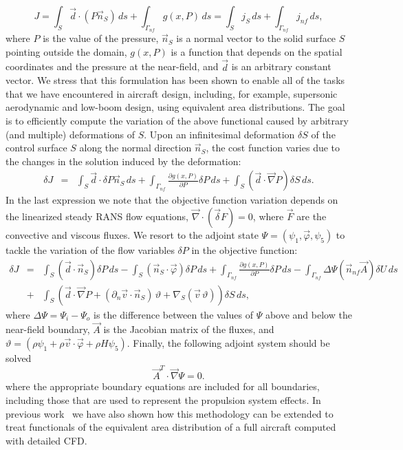 \documentclass[]{aiaa-tc}
\begin{document}
\begin{equation}
J =\int_S{\vec d \cdot (P \vec n_S)\,ds}+\int_{\Gamma_{nf}}{g(x,P)\,ds} = \int_S{j_S\,ds}+\int_{\Gamma_{nf}}{j_{nf}\,ds},
\end{equation}
where $P$ is the value of the pressure, $\vec n_S$ is a normal vector to the solid surface $S$ pointing outside the domain, $g(x, P)$ is a function that depends on the spatial coordinates and the pressure at the near-field, and $\vec d$ is an arbitrary constant vector. We stress that this formulation has been shown to enable all of the tasks that we have encountered in aircraft design, including, for example, supersonic aerodynamic and low-boom design, using equivalent area distributions. The goal is to efficiently compute the variation of the above functional caused by arbitrary (and multiple) deformations of $S$.
%
Upon an infinitesimal deformation $\delta S$ of the control surface $S$ along the normal direction $\vec n_S$, the cost function varies due to the changes in the solution induced by the deformation:
\begin{eqnarray} \label{objvar}
\delta J &=&  \int_S{\vec d \cdot \delta P \vec n_S \,ds} + \int_{\Gamma_{nf}}{\frac{\partial g(x,P)}{\partial P}\delta P\,ds}  + \int_{S}{(\vec d\cdot\vec\nabla P )\delta S \,ds}.
\end{eqnarray}
%
In the last expression we note that the objective function variation depends on the linearized steady RANS flow equations, $\vec\nabla \cdot (\vec \delta F) = 0$, where $\vec F$ are the convective and viscous fluxes. We resort to the adjoint state $\Psi =(\psi_1, \vec \varphi, \psi_5 )$ to tackle the variation of the flow variables $\delta P$ in the objective function:
\begin{eqnarray}
\delta J &=&\int_S{(\vec d \cdot \vec n_S)\delta P  \,ds} - \int_{S}{(\vec n_S\cdot\vec \varphi) \delta P\,ds} + \int_{\Gamma_{nf}}{\frac{\partial g(x,P)}{\partial P}\delta P\,ds}  -  \int_{\Gamma_{nf}}{\Delta \Psi \left(\vec n_{nf} \vec A\right)\delta U\,ds} \nonumber \\
&+& \int_{S}{\left(\vec d\cdot\vec\nabla P + (\partial_n \vec v\cdot \vec n_S)\,\vartheta+\nabla_S(\vec v \,\vartheta )\right)\delta S\,ds},
\end{eqnarray}
where $\Delta \Psi = \Psi_i-\Psi_o$ is the difference between the values of $\Psi$ above and below the near-field boundary, $\vec A$ is the Jacobian matrix of the fluxes, and $\vartheta = (\rho \psi_1+\rho\vec v\cdot \vec\varphi+\rho H\psi_5)$. Finally, the following adjoint system should be solved
\begin{equation}
\vec A^T  \cdot \vec \nabla \Psi= 0.
\end{equation}
where the appropriate boundary equations are included for all boundaries, including those that are used to represent the propulsion system effects.  In previous work~\cite{Palacios:Adjoint-Based} we have also shown how this methodology can be extended to treat functionals of the equivalent area distribution of a full aircraft computed with detailed CFD.
\end{document}
